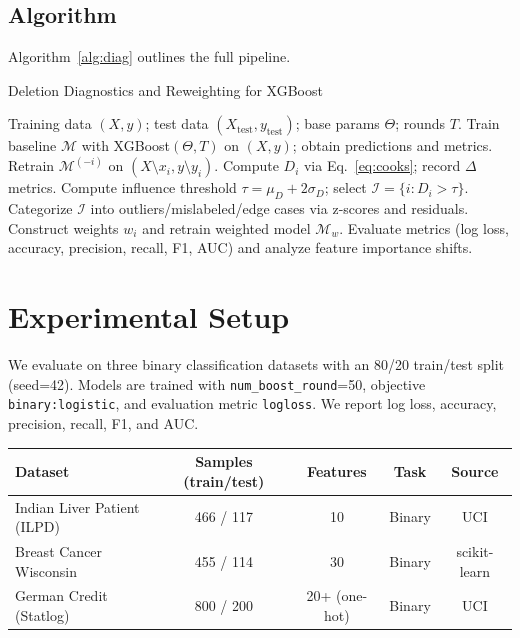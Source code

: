 \documentclass[sn-basic]{sn-jnl} %
\begin{document}
\subsection{Algorithm}
Algorithm~\ref{alg:diag} outlines the full pipeline.

\begin{algorithm}[H]
\caption{Deletion Diagnostics and Reweighting for XGBoost}
\label{alg:diag}
\begin{algorithmic}[1]
\Require Training data $(X, y)$; test data $(X_{\text{test}}, y_{\text{test}})$; base params $\Theta$; rounds $T$.
\State Train baseline $\mathcal{M}$ with XGBoost$(\Theta, T)$ on $(X,y)$; obtain predictions and metrics.
  \State Retrain $\mathcal{M}^{(-i)}$ on $(X\setminus x_i, y\setminus y_i)$.
  \State Compute $D_i$ via Eq.~\eqref{eq:cooks}; record $\Delta$metrics.
\EndFor
\State Compute influence threshold $\tau=\mu_D+2\sigma_D$; select $\mathcal{I}=\{i: D_i>\tau\}$.
\State Categorize $\mathcal{I}$ into outliers/mislabeled/edge cases via z-scores and residuals.
\State Construct weights $w_i$ and retrain weighted model $\mathcal{M}_w$.
\State Evaluate metrics (log loss, accuracy, precision, recall, F1, AUC) and analyze feature importance shifts.
\end{algorithmic}
\end{algorithm}

\section{Experimental Setup}
We evaluate on three binary classification datasets with an 80/20 train/test split (seed=42). Models are trained with \texttt{num\_boost\_round}=50, objective \texttt{binary:logistic}, and evaluation metric \texttt{logloss}. We report log loss, accuracy, precision, recall, F1, and AUC.

\begin{center}
\label{tab:datasets}
\begin{tabular}{lcccc}
\toprule
Dataset & Samples (train/test) & Features & Task & Source \\
\midrule
Indian Liver Patient (ILPD) & 466 / 117 & 10 & Binary & UCI \\
Breast Cancer Wisconsin & 455 / 114 & 30 & Binary & scikit-learn \\
German Credit (Statlog) & 800 / 200 & 20+ (one-hot) & Binary & UCI \\
\bottomrule
\end{tabular}
\end{center}
\end{document}
